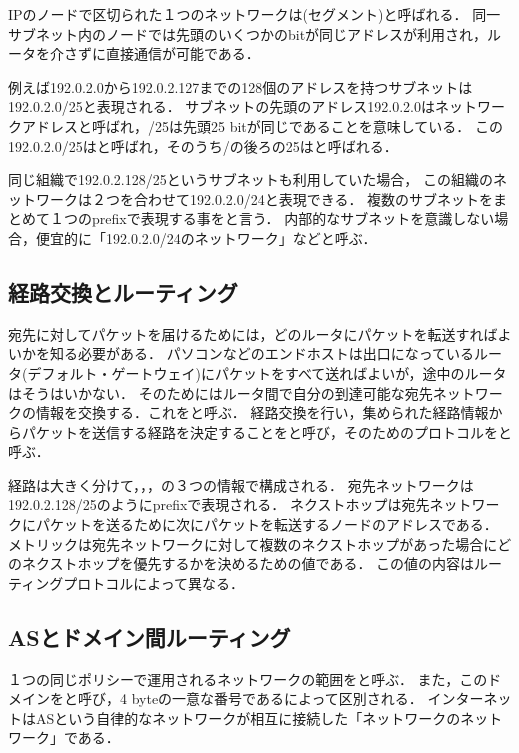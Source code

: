 IPのノードで区切られた１つのネットワークは(セグメント)と呼ばれる．
同一サブネット内のノードでは先頭のいくつかのbitが同じアドレスが利用され，ルータを介さずに直接通信が可能である．

例えば192.0.2.0から192.0.2.127までの128個のアドレスを持つサブネットは192.0.2.0/25と表現される．
サブネットの先頭のアドレス192.0.2.0はネットワークアドレスと呼ばれ，/25は先頭25 bitが同じであることを意味している．
この192.0.2.0/25はと呼ばれ，そのうち/の後ろの25はと呼ばれる．

同じ組織で192.0.2.128/25というサブネットも利用していた場合，
この組織のネットワークは２つを合わせて192.0.2.0/24と表現できる．
複数のサブネットをまとめて１つのprefixで表現する事をと言う．
内部的なサブネットを意識しない場合，便宜的に「192.0.2.0/24のネットワーク」などと呼ぶ．

\subsection{経路交換とルーティング}

宛先に対してパケットを届けるためには，どのルータにパケットを転送すればよいかを知る必要がある．
パソコンなどのエンドホストは出口になっているルータ(デフォルト・ゲートウェイ)にパケットをすべて送ればよいが，途中のルータはそうはいかない．
そのためにはルータ間で自分の到達可能な宛先ネットワークの情報を交換する．これをと呼ぶ．
経路交換を行い，集められた経路情報からパケットを送信する経路を決定することをと呼び，そのためのプロトコルをと呼ぶ．

経路は大きく分けて，，，の３つの情報で構成される．
宛先ネットワークは192.0.2.128/25のようにprefixで表現される．
ネクストホップは宛先ネットワークにパケットを送るために次にパケットを転送するノードのアドレスである．
メトリックは宛先ネットワークに対して複数のネクストホップがあった場合にどのネクストホップを優先するかを決めるための値である．
この値の内容はルーティングプロトコルによって異なる．


\subsection{ASとドメイン間ルーティング}

１つの同じポリシーで運用されるネットワークの範囲をと呼ぶ．
また，このドメインをと呼び，4 byteの一意な番号であるによって区別される．
インターネットはASという自律的なネットワークが相互に接続した「ネットワークのネットワーク」である．

